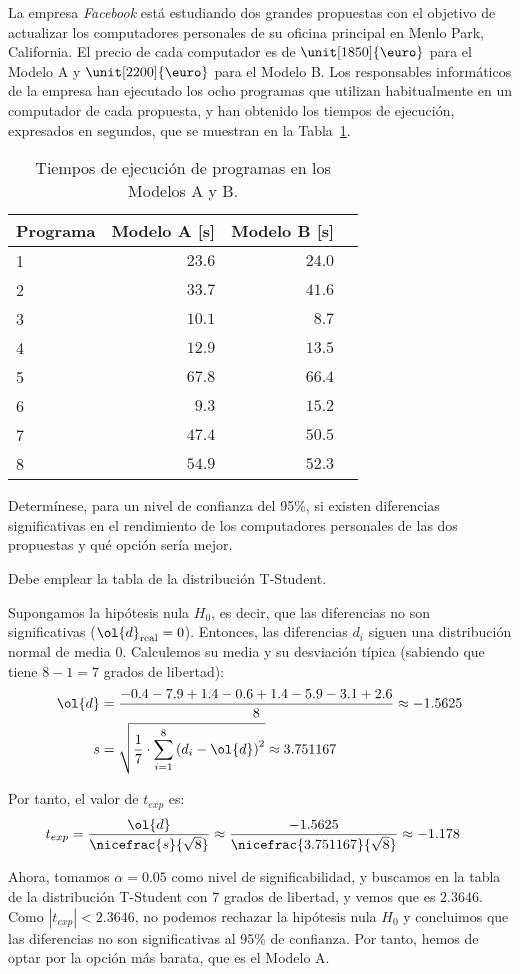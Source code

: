 \begin{ejercicio}\label{ej:4.12}
La empresa \emph{Facebook} está estudiando dos grandes propuestas con el objetivo de actualizar los computadores personales de su oficina principal en Menlo Park, California. El precio de cada computador es de $\unit[1850]{\text{\euro}}$ para el Modelo A y $\unit[2200]{\text{\euro}}$ para el Modelo B. Los responsables informáticos de la empresa han ejecutado los ocho programas que utilizan habitualmente en un computador de cada propuesta, y han obtenido los tiempos de ejecución, expresados en segundos, que se muestran en la Tabla~\ref{tab:ej:4.12}.
\begin{table}[h]
\centering
\begin{tabular}{@{}lrrr@{}}
\toprule
Programa & Modelo A [s] & Modelo B [s] \\ \midrule
1 & $23.6$ & $24.0$ \\
2 & $33.7$ & $41.6$ \\
3 & $10.1$ & $8.7$ \\
4 & $12.9$ & $13.5$ \\
5 & $67.8$ & $66.4$ \\
6 & $9.3$ & $15.2$ \\
7 & $47.4$ & $50.5$ \\
8 & $54.9$ & $52.3$ \\ \bottomrule
\end{tabular}
\caption{Tiempos de ejecución de programas en los Modelos A y B.}
\label{tab:ej:4.12}
\end{table}
Determínese, para un nivel de confianza del 95\%, si existen diferencias significativas en el rendimiento de los computadores personales de las dos propuestas y qué opción sería mejor.
\begin{observacion}
Debe emplear la tabla de la distribución T-Student.
\end{observacion}

Supongamos la hipótesis nula $H_0$, es decir, que las diferencias no son significativas ($\ol{d}_{\text{real}}=0$). Entonces, las diferencias $d_i$ siguen una distribución normal de media $0$. Calculemos su media y su desviación típica (sabiendo que tiene $8-1=7$ grados de libertad):
\begin{align*}
    \ol{d} &= \dfrac{-0.4 - 7.9 + 1.4 - 0.6 + 1.4 - 5.9 - 3.1 + 2.6}{8} \approx -1.5625\\
    s &= \sqrt{\dfrac{1}{7}\cdot \sum_{i=1}^8 \left(d_i-\ol{d}\right)^2} \approx 3.751167
\end{align*}

Por tanto, el valor de $t_{exp}$ es:
\begin{align*}
    t_{exp} &= \dfrac{\ol{d}}{\nicefrac{s}{\sqrt{8}}} \approx \dfrac{-1.5625}{\nicefrac{3.751167}{\sqrt{8}}} \approx -1.178
\end{align*}

Ahora, tomamos $\alpha=0.05$ como nivel de significabilidad, y buscamos en la tabla de la distribución T-Student con $7$ grados de libertad, y vemos que es $2.3646$. Como $|t_{exp}| < 2.3646$, no podemos rechazar la hipótesis nula $H_0$ y concluimos que las diferencias no son significativas al 95\% de confianza. Por tanto, hemos de optar por la opción más barata, que es el Modelo A.
\end{ejercicio}
